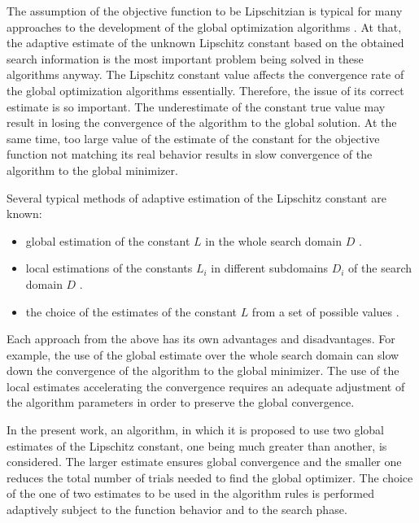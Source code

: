 \documentclass[runningheads]{llncs}
\begin{document}
The assumption of the objective function to be Lipschitzian is typical for many approaches to the development of the global optimization algorithms \cite{Evtushenko2013,Zilinskas2010,Pinter1996,Strongin2000}. At that, the adaptive estimate of the unknown Lipschitz constant based on the obtained search information is the most important problem being solved in these algorithms anyway. 
The Lipschitz constant value affects the convergence rate of the global optimization algorithms essentially. Therefore, the issue of its correct estimate is so important. 
The underestimate of the constant true value may result in losing the convergence of the algorithm to the global solution. At the same time, too large value of the estimate of the constant for the objective function not matching its real behavior results in slow convergence of the algorithm to the global minimizer. 

Several typical methods of adaptive estimation of the Lipschitz constant are known:
\begin{itemize}
	\item global estimation of the constant $L$ in the whole search domain $D$ \cite{Horst1996,Pinter1996,Strongin2000}.
	\item local estimations of the constants $L_i$ in different subdomains $D_i$ of the search domain $D$ \cite{Kvasov2003,Sergeyev2010,Sergeyev2016}.
	\item the choice of the estimates of the constant $L$ from a set of possible values \cite{Gablonsky2001,Jones1993,Jones2009,Sergeyev2006}.
\end{itemize}

Each approach from the above has its own advantages and disadvantages. For example, the use of the global estimate over the whole search domain can slow down the convergence of the algorithm to the global minimizer. The use of the local estimates accelerating the convergence requires an adequate adjustment of the algorithm parameters in order to preserve the global convergence. 

In the present work, an algorithm, in which it is proposed to use two global estimates of the Lipschitz constant, one being much greater than another, is considered. 
The larger estimate ensures global convergence and the smaller one reduces the total number of trials needed to find the global optimizer.
The choice of the one of two estimates to be used in the algorithm rules is performed adaptively subject to the function behavior and to the search phase.
\end{document}
